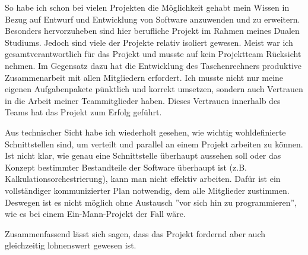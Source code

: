 So habe ich schon bei vielen Projekten die Möglichkeit gehabt mein Wissen in Bezug auf Entwurf und Entwicklung von Software anzuwenden und zu erweitern. Besonders hervorzuheben sind hier berufliche Projekt im Rahmen meines Dualen Studiums. Jedoch sind viele der Projekte relativ isoliert gewesen. Meist war ich gesamtverantwortlich für das Projekt und musste auf kein Projektteam Rücksicht nehmen. Im Gegensatz dazu hat die Entwicklung des Taschenrechners produktive Zusammenarbeit mit allen Mitgliedern erfordert. Ich musste nicht nur meine eigenen Aufgabenpakete pünktlich und korrekt umsetzen, sondern auch Vertrauen in die Arbeit meiner Teammitglieder haben. Dieses Vertrauen innerhalb des Teams hat das Projekt zum Erfolg geführt.

Aus technischer Sicht habe ich wiederholt gesehen, wie wichtig wohldefinierte Schnittstellen sind, um verteilt und parallel an einem Projekt arbeiten zu können. Ist nicht klar, wie genau eine Schnittstelle überhaupt aussehen soll oder das Konzept bestimmter Bestandteile der Software überhaupt ist (z.B. Kalkulationsorchestrierung), kann man nicht effektiv arbeiten. Dafür ist ein vollständiger kommunizierter Plan notwendig, dem alle Mitglieder zustimmen. Deswegen ist es nicht möglich ohne Austausch ''vor sich hin zu programmieren'', wie es bei einem Ein-Mann-Projekt der Fall wäre.

Zusammenfassend lässt sich sagen, dass das Projekt fordernd aber auch gleichzeitig lohnenswert gewesen ist.
